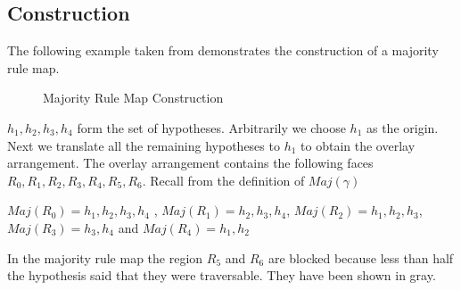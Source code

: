 \documentclass[a4paper,10pt]{article}
\begin{document}
\subsection{Construction}
The following example taken from \cite{key1} demonstrates the construction of a majority rule map.

\begin{figure}[h]
\begin{center}
\caption{\label{fig:Construction}Majority Rule Map Construction}
\end{center}
\end{figure}

${h_{1},h_{2},h_{3},h_{4}}$ form the set of hypotheses. Arbitrarily we choose $h_{1}$ as the origin. Next we translate all the 
remaining hypotheses to $h_{1}$ to obtain the overlay arrangement. The overlay arrangement contains the following faces
$R_{0},R_{1},R_{2},R_{3},R_{4},R_{5},R_{6}$. Recall from the definition of $Maj(\gamma)$



$  Maj(R_{0})  =  {h_{1}, h_{2}, h_{3}, h_{4}} $ , $  Maj(R_{1})  =  { h_{2}, h_{3}, h_{4}} $, $ Maj(R_{2})  =  {h_{1}, h_{2}, h_{3}} $,
$  Maj(R_{3})  =  {h_{3}, h_{4}} $ and $  Maj(R_{4})  =  {h_{1}, h_{2}} $



In the majority rule map the region $R_{5}$ and $R_{6}$ are blocked because less than half the hypothesis said that they were
 traversable. They have been shown in gray.
\end{document}
